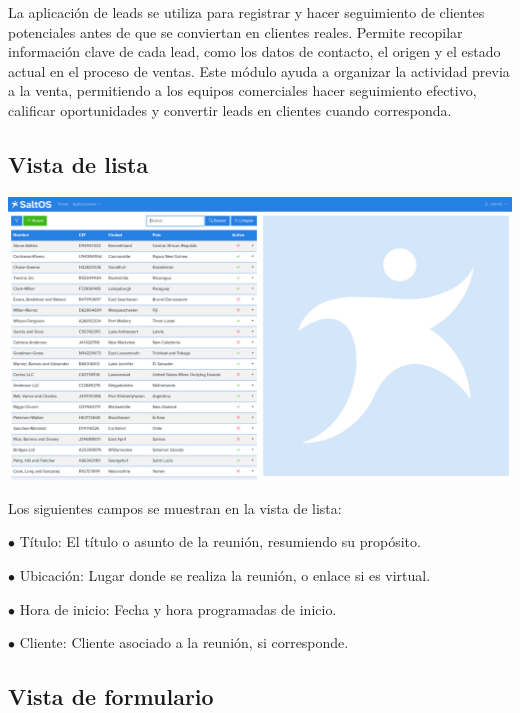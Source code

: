\documentclass[a4paper]{article}
\begin{document}
La aplicación de leads se utiliza para registrar y hacer seguimiento de clientes potenciales antes de que se conviertan en clientes reales.
Permite recopilar información clave de cada lead, como los datos de contacto, el origen y el estado actual en el proceso de ventas.
Este módulo ayuda a organizar la actividad previa a la venta, permitiendo a los equipos comerciales hacer seguimiento efectivo, calificar oportunidades
y convertir leads en clientes cuando corresponda.

\hypertarget{toc58}{}
\subsection{Vista de lista}

\begin{center}\includegraphics[width=1\textwidth]{../ujest/snaps/test-screenshots-js-screenshots-crm-leads-list-es-es-1-snap.png}\end{center}

Los siguientes campos se muestran en la vista de lista:

\begin{compactitem}
\item[\color{myblue}$\bullet$] Título: El título o asunto de la reunión, resumiendo su propósito.
\item[\color{myblue}$\bullet$] Ubicación: Lugar donde se realiza la reunión, o enlace si es virtual.
\item[\color{myblue}$\bullet$] Hora de inicio: Fecha y hora programadas de inicio.
\item[\color{myblue}$\bullet$] Cliente: Cliente asociado a la reunión, si corresponde.
\end{compactitem}

\hypertarget{toc59}{}
\subsection{Vista de formulario}
\end{document}
